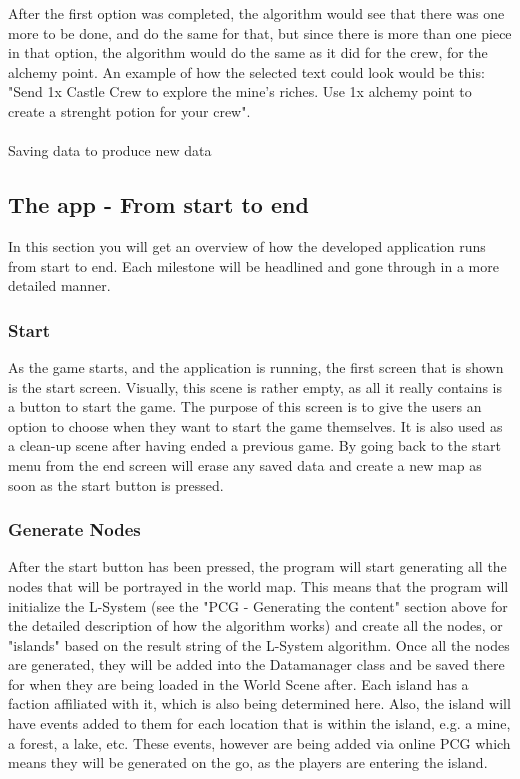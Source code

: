 After the first option was completed, the algorithm would see that there was one more to be done, and do the same for that, but since there is more than one piece in that option, the algorithm would do the same as it did for the crew, for the alchemy point.
An example of how the selected text could look would be this: "Send 1x Castle Crew to explore the mine's riches. Use 1x alchemy point to create a strenght potion for your crew".\\\\


Saving data to produce new data

\subsection{The app - From start to end}
In this section you will get an overview of how the developed application runs from start to end. Each milestone will be headlined and gone through in a more detailed manner.

\subsubsection{Start}
As the game starts, and the application is running, the first screen that is shown is the start screen. Visually, this scene is rather empty, as all it really contains is a button to start the game. The purpose of this screen is to give the users an option to choose when they want to start the game themselves. It is also used as a clean-up scene after having ended a previous game. By going back to the start menu from the end screen will erase any saved data and create a new map as soon as the start button is pressed.

\subsubsection{Generate Nodes}
After the start button has been pressed, the program will start generating all the nodes that will be portrayed in the world map. This means that the program will initialize the L-System (see the "PCG - Generating the content" section above for the detailed description of how the algorithm works) and create all the nodes, or "islands" based on the result string of the L-System algorithm. Once all the nodes are generated, they will be added into the Datamanager class and be saved there for when they are being loaded in the World Scene after. 
Each island has a faction affiliated with it, which is also being determined here. Also, the island will have events added to them for each location that is within the island, e.g. a mine, a forest, a lake, etc. These events, however are being added via online PCG which means they will be generated on the go, as the players are entering the island.

